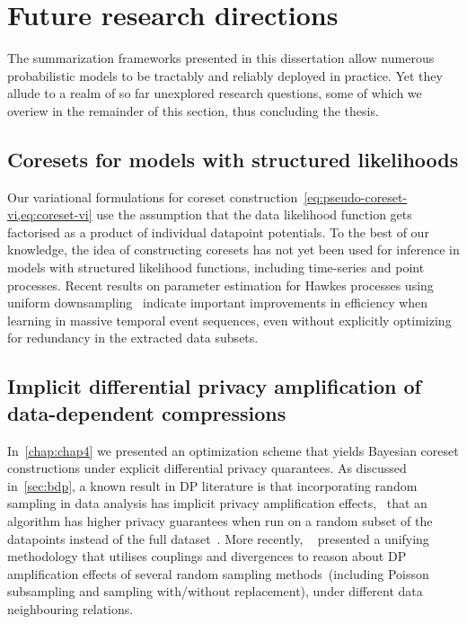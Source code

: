 \section{Future research directions}
\label{sec:future-research-directions}
The summarization frameworks presented in this dissertation allow numerous probabilistic models to be tractably and reliably deployed in practice. Yet they allude to a realm of so far unexplored research questions, some of which we overiew in the remainder of this section, thus concluding the thesis.

\subsection{Coresets for models with structured likelihoods}
\label{subsec:structure-liks}

Our variational formulations for coreset construction~\cref{eq:pseudo-coreset-vi,eq:coreset-vi} use the assumption that the data likelihood function gets factorised as a product of individual datapoint potentials. To the best of our knowledge, the idea of constructing coresets has not yet been used for inference in models with structured likelihood functions, including time-series and point processes. Recent results on parameter estimation for Hawkes processes using uniform downsampling~\citep{li19} indicate important improvements in efficiency when learning in massive temporal event sequences, even without explicitly optimizing for redundancy in the extracted data subsets.

\subsection{Implicit differential privacy amplification of data-dependent compressions}
\label{subsec:implicit-dp-amplification}

In~\cref{chap:chap4} we presented an optimization scheme that yields Bayesian coreset constructions under explicit differential privacy quarantees. As discussed in~\cref{sec:bdp}, a known result in DP literature is that incorporating random sampling in data analysis has implicit privacy amplification effects, \ie~that an algorithm has higher privacy guarantees when run on a random subset of the datapoints instead of the full dataset~\citep{li12, beimel13, bassily14, abadi16}. More recently, ~\textcite{balle18} presented a unifying methodology that utilises couplings and divergences to reason about DP amplification effects of several random sampling methods~(including Poisson subsampling and sampling with/without replacement), under different data neighbouring relations.

